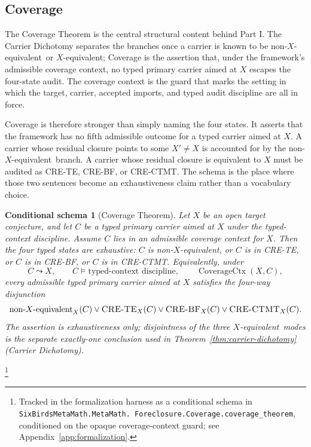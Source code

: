 \documentclass[11pt]{article}
\newcommand{\Xequiv}{$X$-equivalent}
\newcommand{\nonXequiv}{non-$X$-equivalent}
\newcommand{\CRETE}{\textsc{CRE-TE}}
\newcommand{\CREBF}{\textsc{CRE-BF}}
\newcommand{\CRECTMT}{\textsc{CRE-CTMT}}
\newcommand{\thmCarrierDichotomy}{Theorem~\ref{thm:carrier-dichotomy} (Carrier Dichotomy)}
\newcommand{\TCD}{typed-context discipline}
\newtheorem{schema}[theorem]{Conditional schema}
\theoremstyle{definition}
\begin{document}
\subsection{Coverage}\label{sec:foreclosure:coverage}

The Coverage Theorem is the central structural content behind Part I.
The Carrier Dichotomy separates the branches once a carrier is known
to be \nonXequiv\ or \Xequiv; Coverage is the assertion that, under the
framework's admissible coverage context, no typed primary carrier aimed
at \(X\) escapes the four-state audit.  The coverage context is the
guard that marks the setting in which the target, carrier, accepted
imports, and typed audit discipline are all in force.

Coverage is therefore stronger than simply naming the four states.  It
asserts that the framework has no fifth admissible outcome for a typed
carrier aimed at \(X\).  A carrier whose residual closure points to
some \(X'\neq X\) is accounted for by the \nonXequiv\ branch.  A
carrier whose residual closure is equivalent to \(X\) must be audited
as \CRETE, \CREBF, or \CRECTMT.  The schema is the place where those
two sentences become an exhaustiveness claim rather than a vocabulary
choice.

\begin{schema}[Coverage Theorem]\label{thm:coverage}
Let \(X\) be an open target conjecture, and let \(C\) be a typed
primary carrier aimed at \(X\) under the \TCD.  Assume \(C\) lies in an
admissible coverage context for \(X\).  Then the four typed states are
exhaustive: \(C\) is \nonXequiv, or \(C\) is in \textup{\CRETE},
or \(C\) is in \textup{\CREBF}, or \(C\) is in \textup{\CRECTMT}.
Equivalently, under
\[
  C\leadsto X,\qquad C\models\text{\TCD},\qquad
  \operatorname{CoverageCtx}(X,C),
\]
every admissible typed primary carrier aimed at \(X\) satisfies the
four-way disjunction
\[
  \mbox{\nonXequiv}_X(C)\vee
  \mbox{\CRETE}_X(C)\vee
  \mbox{\CREBF}_X(C)\vee
  \mbox{\CRECTMT}_X(C).
\]
The assertion is exhaustiveness only; disjointness of the three
\Xequiv\ modes is the separate exactly-one conclusion used in
\thmCarrierDichotomy.
\end{schema}

\footnote{\raggedright Tracked in the formalization harness as a
conditional schema in \texttt{SixBirdsMetaMath.MetaMath.\allowbreak
Foreclosure.Coverage.\allowbreak coverage\_theorem}, conditioned on the
opaque coverage-context guard; see Appendix~\ref{app:formalization}.}
\end{document}
